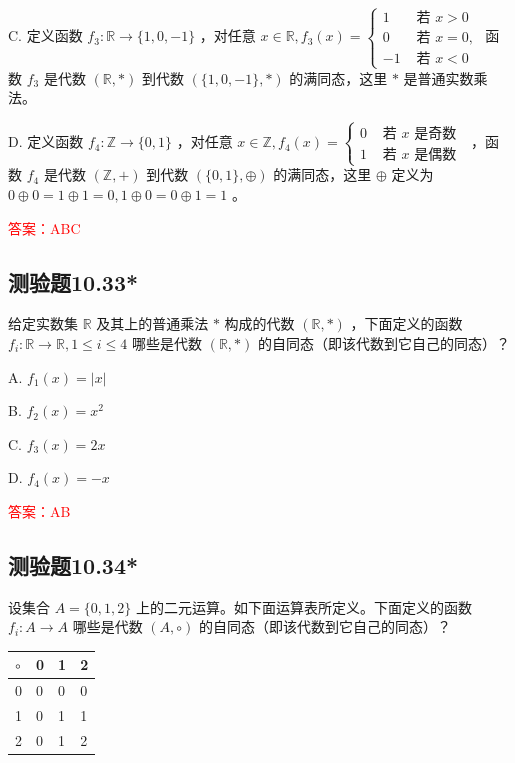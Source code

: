 \documentclass[UTF8, heading=true]{ctexart}
\begin{document}
C. 定义函数 $f_3: \mathbb{R} \rightarrow\{1,0,-1\}$ ，对任意 $x \in \mathbb{R}, f_3(x)=\left\{\begin{array}{ll}1 & \text { 若 } x>0 \\ 0 & \text { 若 } x=0, \\ -1 & \text { 若 } x<0\end{array}\right.$ 函数 $f_3$ 是代数 $(\mathbb{R}, *)$ 到代数 $(\{1,0,-1\}, *)$ 的满同态，这里 $*$ 是普通实数乘法。

D. 定义函数 $f_4: \mathbb{Z} \rightarrow\{0,1\}$ ，对任意 $x \in \mathbb{Z}, f_4(x)=\left\{\begin{array}{ll}0 & \text { 若 } x \text { 是奇数 } \\ 1 & \text { 若 } x \text { 是偶数 }\end{array}\right.$ ，函数 $f_4$ 是代数 $(\mathbb{Z},+)$ 到代数 $(\{0,1\}, \oplus)$ 的满同态，这里 $\oplus$ 定义为 $0 \oplus 0=1 \oplus 1=0,1 \oplus 0=0 \oplus 1=1$ 。


\textcolor{red}{答案：ABC}

\subsection{测验题10.33*}

给定实数集 $\mathbb{R}$ 及其上的普通乘法 $*$ 构成的代数 $(\mathbb{R}, *)$ ，下面定义的函数 $f_i: \mathbb{R} \rightarrow \mathbb{R}, 1 \leq i \leq 4$ 哪些是代数 $(\mathbb{R}, *)$ 的自同态（即该代数到它自己的同态）？

A. $ f_1(x)=|x|$

B. $f_2(x)=x^2$

C. $f_3(x)=2 x$

D. $f_4(x)=-x$

\textcolor{red}{答案：AB}

\subsection{测验题10.34*}

设集合 $A=\{0,1,2\}$ 上的二元运算。如下面运算表所定义。下面定义的函数 $f_i: A \rightarrow A$ 哪些是代数 $(A, \circ)$ 的自同态（即该代数到它自己的同态）？
\begin{table}[H]
  \renewcommand{\arraystretch}{1.5}
  \centering
\begin{tabular}{l|lll}
\hline$\circ$ & 0 & 1 & 2 \\
\hline 0 & 0 & 0 & 0 \\
1 & 0 & 1 & 1 \\
2 & 0 & 1 & 2 \\
\hline
\end{tabular}
\end{table}
\end{document}
